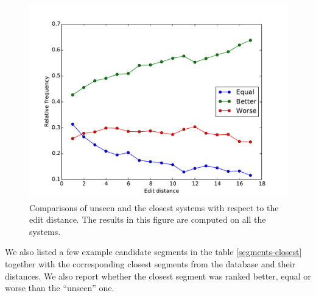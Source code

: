 \begin{figure}
    \begin{center}
        \includegraphics[width=14cm]{img/per-distance.pdf}
    \end{center}

    \caption[Comparisons of unseen and the closest systems with respect to the
    edit distance]{Comparisons of unseen and the closest systems with respect
    to the edit distance. The results in this figure are computed on all the
systems.}

    \label{better-worse-equal-with-edit-distance}
\end{figure}




We also listed a few example candidate segments in the table
\ref{segments-closest} together with the corresponding closest segments from
the database and their distances. We also report whether the closest segment
was ranked better, equal or worse than the ``unseen'' one.

